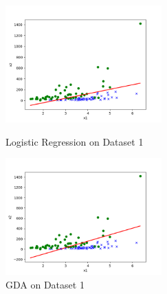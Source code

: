 \begin{answer}
    \begin{figure}[htbp]
        \centering
        \begin{minipage}[t]{0.48\textwidth}
        \centering
        \includegraphics[width=6cm]{../src/output/p01b_pred_1.png}
        \caption{Logistic Regression on Dataset 1}
        \end{minipage}
        \begin{minipage}[t]{0.48\textwidth}
        \centering
        \includegraphics[width=6cm]{../src/output/p01e_pred_1.png}
        \caption{GDA on Dataset 1}
        \end{minipage}
    \end{figure}
\end{answer}
